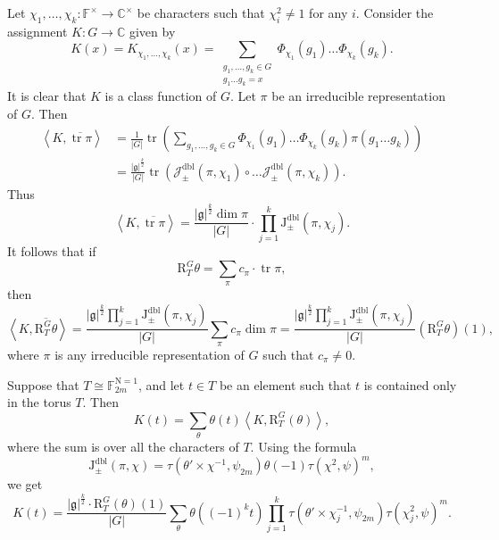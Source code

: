 \documentclass[12pt, reqno]{amsart}
\theoremstyle{definition}
\theoremstyle{definition}
\theoremstyle{definition}
\newcommand{\cComplex}{\mathbb{C}}
\newcommand{\multiplicativegroup}[1]{#1^{\times}}
\newcommand{\conjugate}[1]{\overline{#1}}
\newcommand{\sizeof}[1]{\left|#1\right|}
\newcommand{\innerproduct}[2]{\left\langle #1,#2\right\rangle}
\newcommand{\fieldCharacter}{\psi}
\newcommand{\trace}{\operatorname{tr}}
\newcommand{\aFieldNorm}{\mathrm{N}}
\newcommand{\finiteField}{\mathbb{F}}
\newcommand{\finiteFieldExtension}[1]{\finiteField_{#1}}
\newcommand{\NormOneGroup}[1]{\finiteFieldExtension{#1}^{\aFieldNorm = 1}}
\newcommand{\dblJacobiSum}[2]{\mathcal{J}_{\pm}^{\mathrm{dbl}}\left(#1, #2\right)}
\newcommand{\dblJacobiSumScalar}[2]{\mathrm{J}_{\pm}^{\mathrm{dbl}}\left(#1, #2\right)}
\newcommand{\lieAlgebra}{\mathfrak{g}}
\newcommand{\DeligneLusztigInduction}[2]{\mathrm{R}_{#1}^{#2}}
\begin{document}
Let $\chi_1, \dots, \chi_k \colon \multiplicativegroup{\finiteField} \to \multiplicativegroup{\cComplex}$ be characters such that $\chi_i^2 \ne 1$ for any $i$. Consider the assignment $K \colon G \to \cComplex$ given by $$K\left(x\right) = K_{\chi_1,\dots,\chi_k}\left(x\right) = \sum_{\substack{g_1, \dots, g_k \in G\\
g_1 \dots g_k = x}} \Phi_{\chi_1}\left(g_1\right) \dots \Phi_{\chi_k}\left(g_k\right).$$
It is clear that $K$ is a class function of $G$. Let $\pi$ be an irreducible representation of $G$. Then \begin{align*}
	 \innerproduct{K}{\conjugate{\trace \pi}} &= \frac{1}{\sizeof{G}}\trace \left(\sum_{g_1,\dots,g_k \in G} \Phi_{\chi_1}\left(g_1\right) \dots \Phi_{\chi_k}\left(g_k\right) \pi\left(g_1 \dots g_k\right) \right) \\
	 &= \frac{\sizeof{\lieAlgebra}^{\frac{k}{2}}}{\sizeof{G}} \trace\left( \dblJacobiSum{\pi}{\chi_1} \circ \dots \dblJacobiSum{\pi}{\chi_k} \right).
\end{align*}
Thus $$\innerproduct{K}{\conjugate{\trace \pi}} = \frac{\sizeof{\lieAlgebra}^{\frac{k}{2}} \dim \pi}{\sizeof{G}} \cdot \prod_{j=1}^k \dblJacobiSumScalar{\pi}{\chi_j}.$$
It follows that if
$$\DeligneLusztigInduction{T}{G}\theta = \sum_{\pi} c_{\pi} \cdot \trace \pi,$$
then $$\innerproduct{K}{\conjugate{\DeligneLusztigInduction{T}{G}\theta}} = \frac{\sizeof{\lieAlgebra}^{\frac{k}{2}} \prod_{j=1}^k \dblJacobiSumScalar{\pi}{\chi_j}}{\sizeof{G}} \sum_{\pi} c_{\pi} \dim \pi = \frac{\sizeof{\lieAlgebra}^{\frac{k}{2}} \prod_{j=1}^k \dblJacobiSumScalar{\pi}{\chi_j}}{\sizeof{G}} \left(\DeligneLusztigInduction{T}{G}\theta\right)\left(1\right),$$
where $\pi$ is any irreducible representation of $G$ such that $c_{\pi} \ne 0$.

Suppose that $T \cong \NormOneGroup{2m}$, and let $t \in T$ be an element such that $t$ is contained only in the torus $T$. Then
$$K\left(t\right) = \sum_{\theta} \theta\left(t\right) \innerproduct{K}{\DeligneLusztigInduction{T}{G}\left(\theta\right)},$$
where the sum is over all the characters of $T$. Using the formula $$\dblJacobiSumScalar{\pi}{\chi} = \tau\left( \theta' \times \chi^{-1}, \fieldCharacter_{2m} \right) \theta\left(-1\right) \tau\left(\chi^2, \fieldCharacter\right)^m,$$
we get
$$K\left(t\right) = \frac{\sizeof{\lieAlgebra}^{\frac{k}{2}} \cdot \DeligneLusztigInduction{T}{G}\left(\theta\right)\left(1\right)}{\sizeof{G}} \sum_{\theta} \theta\left( \left(-1\right)^k t\right) \prod_{j=1}^k \tau\left(\theta' \times \chi_j^{-1}, \fieldCharacter_{2m}\right) \tau\left(\chi_j^2, \fieldCharacter\right)^m.$$
\end{document}

